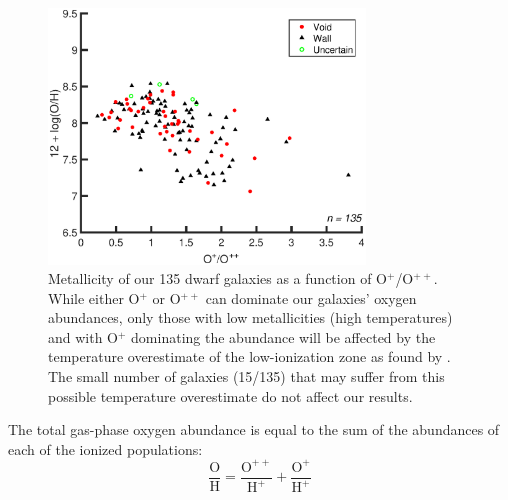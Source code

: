 \begin{figure}
    \includegraphics[width=0.75\textwidth]{Images/Paper1/1sig_I06_dwarf_SF_t3_OpOpp_Z12logOH}
    \caption[O$^+$/O$^{++}$ versus metallicity]{Metallicity of our 135 dwarf 
    galaxies as a function of O$^+$/O$^{++}$.  While either O$^+$ or O$^{++}$ 
    can dominate our galaxies' oxygen abundances, only those with low 
    metallicities (high temperatures) and with O$^+$ dominating the abundance 
    will be affected by the temperature overestimate of the low-ionization zone 
    as found by \cite{Andrews13}.  The small number of galaxies (15/135) that 
    may suffer from this possible temperature overestimate do not affect our 
    results.}
    \label{fig:O2O3_ratio}
\end{figure}  

The total gas-phase oxygen abundance is equal to the sum of the abundances of 
each of the ionized populations:
\begin{equation}
	\frac{\text{O}}{\text{H}} = \frac{\text{O}^{++}}{\text{H}^+} + \frac{\text{O}^+}{\text{H}^+}
\end{equation}



